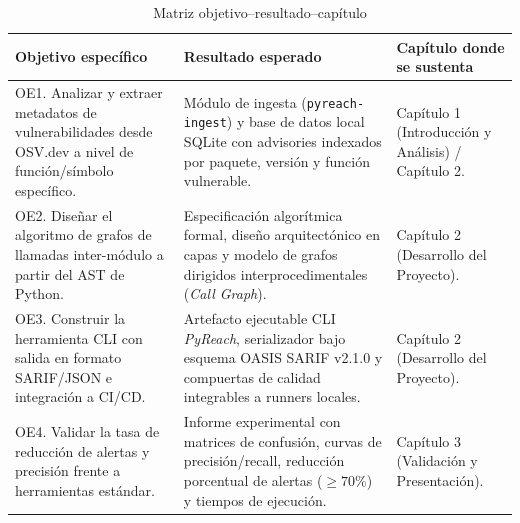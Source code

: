 \begin{table}[H]
\centering
\caption{Matriz objetivo--resultado--capítulo}
\label{tab:matriz_obj_res}
\small
{}
\begin{tabularx}{\textwidth}{>{\raggedright\arraybackslash}p{4.8cm} >{\raggedright\arraybackslash}X >{\centering\arraybackslash}p{3.8cm}}
\toprule
\textbf{Objetivo específico} & \textbf{Resultado esperado} & \textbf{Capítulo donde se sustenta} \\
\midrule
OE1. Analizar y extraer metadatos de vulnerabilidades desde OSV.dev a nivel de función/símbolo específico. & 
Módulo de ingesta (\texttt{pyreach-ingest}) y base de datos local SQLite con advisories indexados por paquete, versión y función vulnerable. & 
Capítulo 1 (Introducción y Análisis) / Capítulo 2. \\ 
\addlinespace
OE2. Diseñar el algoritmo de grafos de llamadas inter-módulo a partir del AST de Python. & 
Especificación algorítmica formal, diseño arquitectónico en capas y modelo de grafos dirigidos interprocedimentales (\textit{Call Graph}). & 
Capítulo 2 (Desarrollo del Proyecto). \\ 
\addlinespace
OE3. Construir la herramienta CLI con salida en formato SARIF/JSON e integración a CI/CD. & 
Artefacto ejecutable CLI \textit{PyReach}, serializador bajo esquema OASIS SARIF v2.1.0 y compuertas de calidad integrables a runners locales. & 
Capítulo 2 (Desarrollo del Proyecto). \\ 
\addlinespace
OE4. Validar la tasa de reducción de alertas y precisión frente a herramientas estándar. & 
Informe experimental con matrices de confusión, curvas de precisión/recall, reducción porcentual de alertas ($\ge 70\%$) y tiempos de ejecución. & 
Capítulo 3 (Validación y Presentación). \\ 
\bottomrule
\end{tabularx}
\end{table}

